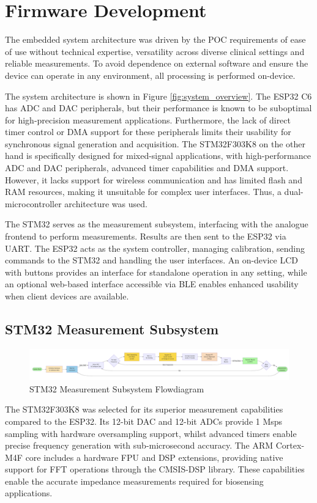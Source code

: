 \section{Firmware Development}
The embedded system architecture was driven by the \ac{POC} requirements of ease of use without technical expertise, versatility across diverse clinical settings and reliable measurements. To avoid dependence on external software and ensure the device can operate in any environment, all processing is performed on-device. 

The system architecture is shown in Figure \ref{fig:system_overview}. The ESP32 C6 has \ac{ADC} and \ac{DAC} peripherals, but their performance is known to be suboptimal for high-precision measurement applications. Furthermore, the lack of direct timer control or \ac{DMA} support for these peripherals limits their usability for synchronous signal generation and acquisition. The STM32F303K8 on the other hand is specifically designed for mixed-signal applications, with high-performance \ac{ADC} and \ac{DAC} peripherals, advanced timer capabilities and \ac{DMA} support. However, it lacks support for wireless communication and has limited flash and RAM resources, making it unsuitable for complex user interfaces. Thus, a dual-microcontroller architecture was used.

The STM32 serves as the measurement subsystem, interfacing with the analogue frontend to perform measurements. Results are then sent to the ESP32 via UART. The ESP32 acts as the system controller, managing calibration, sending commands to the STM32 and handling the user interfaces. An on-device LCD with buttons provides an interface for standalone operation in any setting, while an optional web-based interface accessible via \ac{BLE} enables enhanced usability when client devices are available.

\subsection{STM32 Measurement Subsystem}
\begin{figure}[H]
    \centering
    \includegraphics[width=\textwidth]{STMFlowDiagram.png}
    \caption{STM32 Measurement Subsystem Flowdiagram}
    \label{fig:stm32_flow}
\end{figure}
The STM32F303K8 was selected for its superior measurement capabilities compared to the ESP32. Its 12-bit \ac{DAC} and 12-bit \acp{ADC} provide 1 Msps sampling with hardware oversampling support, whilst advanced timers enable precise frequency generation with sub-microsecond accuracy. The ARM Cortex-M4F core includes a hardware \ac{FPU} and \ac{DSP} extensions, providing native support for \ac{FFT} operations through the CMSIS-DSP library. These capabilities enable the accurate impedance measurements required for biosensing applications.

